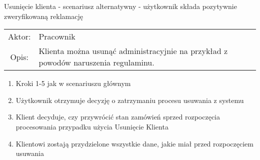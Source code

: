   
  \item Usunięcie klienta - scenariusz alternatywny - użytkownik składa
  pozytywnie zweryfikowaną reklamację
  \\
  \begin{tabularx}{\linewidth}{ c X }
  Aktor: & Pracownik \\
  Opis: & Klienta można usunąć administracyjnie na przykład z powodów
  naruszenia regulaminu.\\
  \end{tabularx}
  \begin{enumerate}
    \item Kroki 1-5 jak w scenariuszu głównym
    \item Użytkownik otrzymuje decyzję o zatrzymaniu procesu usuwania z systemu
    \item Klient decyduje, czy przywrócić stan zamówień sprzed rozpoczęcia
    procesowania przypadku użycia Usunięcie Klienta
    \item Klientowi zostają przydzielone wszystkie dane, jakie miał przed
    rozpoczęciem usuwania
  \end{enumerate}